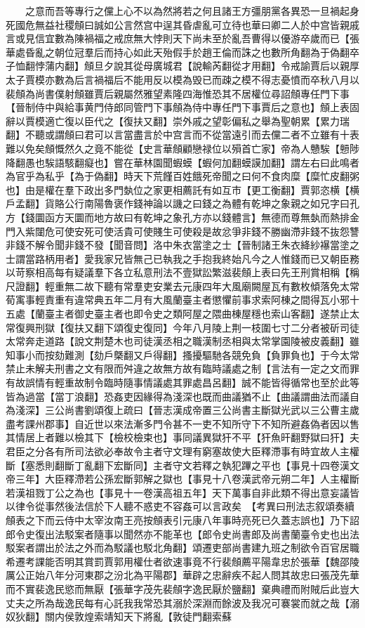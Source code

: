 　　之意而吾等專行之儻上心不以為然將若之何且諸王方彊朋黨各異恐一旦禍起身死國危無益社稷頠曰誠如公言然宫中逞其昏虐亂可立待也華曰卿二人於中宫皆親戚言或見信宜數為陳禍福之戒庶無大悖則天下尚未至於亂吾曹得以優游卒歲而已【張華處昏亂之朝位冠羣后而持心如此天殆假手於趙王倫而誅之也數所角翻為于偽翻卒子恤翻悖蒲内翻】頠旦夕說其從母廣城君【說輸芮翻從才用翻】令戒諭賈后以親厚太子賈模亦數為后言禍福后不能用反以模為毁已而疎之模不得志憂憤而卒秋八月以裴頠為尚書僕射頠雖賈后親屬然雅望素隆四海惟恐其不居權位尋詔頠專任門下事【晉制侍中與給事黄門侍郎同管門下事頠為侍中專任門下事賈后之意也】頠上表固辭以賈模適亡復以臣代之【復扶又翻】崇外戚之望彰偏私之舉為聖朝累【累力瑞翻】不聽或謂頠曰君可以言當盡言於中宫言而不從當遠引而去儻二者不立雖有十表難以免矣頠慨然久之竟不能從【史言華頠顧戀禄位以殞首亡家】帝為人戇騃【戅陟降翻愚也騃語駭翻癡也】嘗在華林園聞蝦蟆【蝦何加翻蟆謨加翻】謂左右曰此鳴者為官乎為私乎【為于偽翻】時天下荒饉百姓餓死帝聞之曰何不食肉糜【糜忙皮翻粥也】由是權在羣下政出多門埶位之家更相薦託有如互市【更工衡翻】賈郭恣横【横戶孟翻】貨賂公行南陽魯褒作錢神論以譏之曰錢之為體有乾坤之象親之如兄字曰孔方【錢圜函方天圜而地方故曰有乾坤之象孔方亦以錢體言】無德而尊無埶而熱排金門入紫闥危可使安死可使活貴可使賤生可使殺是故忿爭非錢不勝幽滯非錢不抜怨讐非錢不解令聞非錢不發【聞音問】洛中朱衣當塗之士【晉制諸王朱衣絳紗襮當塗之士謂當路柄用者】愛我家兄皆無己已執我之手抱我終始凡今之人惟錢而已又朝臣務以苛察相高每有疑議羣下各立私意刑法不壹獄訟繁滋裴頠上表曰先王刑賞相稱【稱尺證翻】輕重無二故下聽有常羣吏安業去元康四年大風廟闕屋瓦有數枚傾落免太常荀㝢事輕責重有違常典五年二月有大風蘭臺主者懲懼前事求索阿棟之間得瓦小邪十五處【蘭臺主者御史臺主者也即令史之類阿屋之隈曲棟屋穩也索山客翻】遂禁止太常復興刑獄【復扶又翻下頌復史復同】今年八月陵上荆一枝圍七寸二分者被斫司徒太常奔走道路【說文荆楚木也司徒漢丞相之職漢制丞相與太常掌園陵被皮義翻】雖知事小而按劾難測【劾戶槩翻又戶得翻】搔擾驅馳各競免負【負罪負也】于今太常禁止未解夫刑書之文有限而舛違之故無方故有臨時議處之制【言法有一定之文而罪有故誤情有輕重故制令臨時隨事情議處其罪處昌呂翻】誠不能皆得循常也至於此等皆為過當【當丁浪翻】恐姦吏因緣得為淺深也既而曲議猶不止【曲議謂曲法而議自為淺深】三公尚書劉頌復上疏曰【晉志漢成帝置三公尚書主斷獄光武以三公曹主歲盡考課州郡事】自近世以來法漸多門令甚不一吏不知所守下不知所避姦偽者因以售其情居上者難以檢其下【檢校檢束也】事同議異獄犴不平【犴魚旰翻野獄曰犴】夫君臣之分各有所司法欲必奉故令主者守文理有窮塞故使大臣釋滯事有時宜故人主權斷【塞悉則翻斷丁亂翻下宏斷同】主者守文若釋之執犯蹕之平也【事見十四卷漢文帝三年】大臣釋滯若公孫宏斷郭解之獄也【事見十八卷漢武帝元朔二年】人主權斷若漢祖戮丁公之為也【事見十一卷漢高祖五年】天下萬事自非此類不得出意妄議皆以律令從事然後法信於下人聽不惑吏不容姦可以言政矣　【考異曰刑法志叙頌奏續頠表之下而云侍中太宰汝南王亮按頠表引元康八年事時亮死已久蓋志誤也】乃下詔郎令史復出法駁案者隨事以聞然亦不能革也【郎令史尚書郎及尚書蘭臺令史也出法駁案者謂出於法之外而為駁議也駁北角翻】頌遷吏部尚書建九班之制欲令百官居職希遷考課能否明其賞罰賈郭用權仕者欲速事竟不行裴頠薦平陽韋忠於張華【魏邵陵厲公正始八年分河東郡之汾北為平陽郡】華辟之忠辭疾不起人問其故忠曰張茂先華而不實裴逸民慾而無厭【張華字茂先裴頠字逸民厭於鹽翻】棄典禮而附賊后此豈大丈夫之所為哉逸民每有心託我我常恐其溺於深淵而餘波及我况可褰裳而就之哉【溺奴狄翻】關内侯敦煌索靖知天下將亂【敦徒門翻索蘇